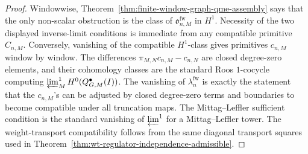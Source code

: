 \begin{proof}
  Windowwise, Theorem~\ref{thm:finite-window-graph-qme-assembly} says that
  the only non-scalar obstruction is the class of
  \(\mathfrak o^{\mathrm{fw}}_{n,M}\) in \(H^1\).  Necessity of the two
  displayed inverse-limit conditions is immediate from any compatible
  primitive \(C_{n,M}\).  Conversely, vanishing of the compatible
  \(H^1\)-class gives primitives \(c_{n,M}\) window by window.  The
  differences \(\pi_{M,N}c_{n,M}-c_{n,N}\) are closed degree-zero
  elements, and their cohomology classes are the standard Roos
  \(1\)-cocycle computing
  \(\varprojlim\nolimits^1_M
  H^0(\mathcal Q^\bullet_{\mathcal G,M}(I))\).  The
  vanishing of \(\lambda^{\mathrm{fw}}_n\) is exactly the statement that
  the \(c_{n,M}\)'s can be adjusted by closed degree-zero terms and
  boundaries to become compatible under all truncation maps.  The
  Mittag--Leffler sufficient condition is the standard vanishing of
  \(\varprojlim^1\) for a Mittag--Leffler tower.  The weight-transport
  compatibility follows from the same diagonal transport squares used in
  Theorem~\ref{thm:wt-regulator-independence-admissible}.
\end{proof}

